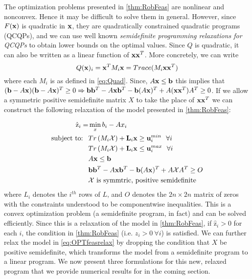 

The optimization problems presented in \cref{thm:RobFeas} are nonlinear and nonconvex.
Hence it may be difficult to solve them in general.
However, since $F(\bold x)$ is quadratic in $\bold x$, they are quadratically constrained quadratic programs (QCQPs), and we can use well known \emph{semidefinite programming relaxations for QCQPs} 
to obtain lower bounds on the optimal values.\cite{VaBo1996} 
Since $Q$ is quadratic, it can also be written as a linear function of $\bold x\bold x^T$.
More concretely, we can write
$$Q(\bold x)_i=\bold x^TM_i\bold x=Trace(M_i\bold x\bold x^T)$$
where each $M_i$ is as defined in \eqref{eq:Quad}. 
Since, $A\bold x\leq \bold b$ this implies that $(\bold b-A\bold x)(\bold b-A\bold x)^T\geq 0\Rightarrow \bold b\bold b^T-A\bold x\bold b^T-\bold b(A\bold x)^T+A(\bold x\bold x^T)A^T\geq 0$. 
If we allow a symmetric positive semidefinite matrix $X$ to take the place of $\bold x\bold x^T$ we can construct the following relaxation of the model presented in \cref{thm:RobFeas}:
 
\begin{subequations}\label{eq:OPTfeasrelax}
\begin{align}
\hat{\mathrm{z}}_{i} = &\min_x b_i-Ax_i  \\
 \text{subject to: } \ &Tr\left(M_i\mathcal{X}\right)+\bold L_i\bold x \geq \bold u_i^{min} \ \ \forall i\\
 & Tr\left(M_i\mathcal{X}\right)+\bold L_i\bold x \leq \bold u_i^{max} \ \ \forall i\\
 	&A\bold x\leq \bold b \\
 	&\bold b\bold b^T-A\bold x\bold b^T-\bold b(A\bold x)^T+A\mathcal{X}A^T\geq O \\
 	&\mathcal{X} \text{ is symmtric, positive semidefinite}
\end{align}
\end{subequations}
where $L_i$ denotes the $i^{th}$ rows of $L$, and $O$ denotes the $2n \times 2n$ matrix of zeros with the constraints understood to be componentwise inequalities. 
This is a convex optimization problem (a semidefinite program, in fact) and can be solved efficiently. 
Since this is a relaxation of the model in \cref{thm:RobFeas}, if $\hat{\mathrm{z}}_i>0$ for each $i$, the condition in \cref{thm:RobFeas} (i.e. $z_i>0 \ \forall i$) is satisfied. 
We can further relax the model in \eqref{eq:OPTfeasrelax} by dropping the condition that $X$ be positive semidefinite, which transforms the model from a semidefinite program to a linear program. 
We now present three formulations for this new, relaxed program that we provide numerical results for in the coming section.

